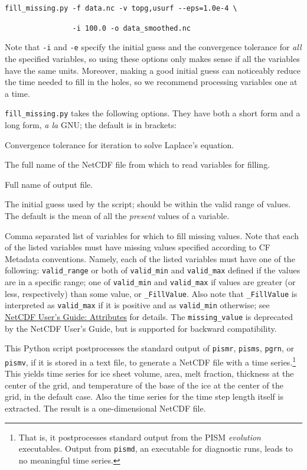 \documentclass[11pt,final]{amsart}
\newcommand{\und}{\_\!\_}
\begin{document}
\verb|fill_missing.py -f data.nc -v topg,usurf --eps=1.0e-4 \|

\verb|                -i 100.0 -o data_smoothed.nc|

Note that \verb|-i| and \verb|-e| specify the initial guess and the convergence tolerance for \emph{all} the specified variables, so using these options only makes sense if all the variables have the same units. Moreover, making a good initial guess can noticeably reduce the time needed to fill in the holes, so we recommend processing variables one at a time.

\opthead  \verb|fill_missing.py| takes the following options.  They have both a short form and a long form, \emph{a la} GNU; the default is in brackets:

  Convergence tolerance for iteration to solve Laplace's equation.

  The full name of the NetCDF file from which to read variables for filling.

\scriptoptdef{o}{out\und file}{no default}  Full name of output file.

\scriptoptdef{i}{initial\und guess}{'mean'}  The initial guess used by the script; should be within the valid range of values. The default is the mean of all the \emph{present} values of a variable.

  Comma separated list of variables for which to fill missing values.  Note that each of the listed variables must have missing values specified according to CF Metadata conventions. Namely, each of the listed variables must have one of the following: \verb|valid_range| or both of \verb|valid_min| and \verb|valid_max| defined if the values are in a specific range; one of \verb|valid_min| and \verb|valid_max| if values are greater (or less, respectively) than some value, or \verb|_FillValue|. Also note that \verb|_FillValue| is interpreted as \verb|valid_max| if it is positive and as \verb|valid_min| otherwise; see \href{http://www.unidata.ucar.edu/software/netcdf/guide_10.html#SEC76}{NetCDF User's Guide: Attributes} for details. The \verb|missing_value| is deprecated by the NetCDF User's Guide, but is supported for backward compatibility.


  This Python script postprocesses the standard output of \verb|pismr|, \verb|pisms|, \verb|pgrn|, or \verb|pismv|, if it is stored in a text file, to generate a NetCDF file with a time series.\footnote{That is, it postprocesses standard output from the PISM \emph{evolution} executables.  Output from \texttt{pismd}, an executable for diagnostic runs, leads to no meaningful time series.}  This yields time series for ice sheet volume, area, melt fraction, thickness at the center of the grid, and temperature of the base of the ice at the center of the grid, in the default case.  Also the time series for the time step length itself is extracted.  The result is a one-dimensional NetCDF file.
\end{document}
